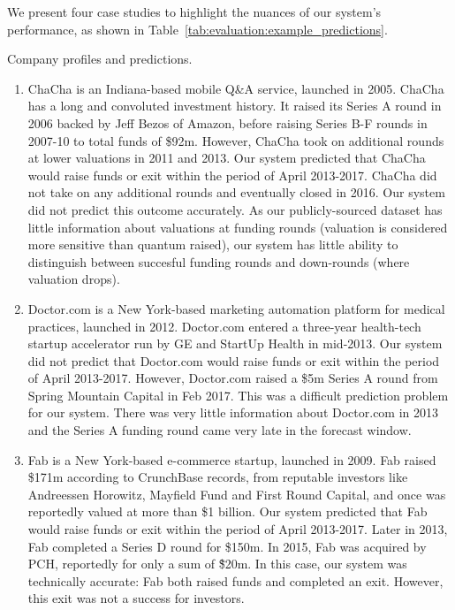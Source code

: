 ﻿\documentclass[../thesis/thesis.tex]{subfiles}
\begin{document}
We present four case studies to highlight the nuances of our system's performance, as shown in Table~\ref{tab:evaluation:example_predictions}. 

\begin{table}[!htb]
    \centering
    \scalebox{0.9}{}
    \caption[Company profiles and predictions]{Company profiles and predictions.}
    \label{tab:evaluation:example_predictions}
\end{table}

\begin{enumerate}

\item ChaCha is an Indiana-based mobile Q\&A service, launched in 2005. ChaCha has a long and convoluted investment history. It raised its Series A round in 2006 backed by Jeff Bezos of Amazon, before raising Series B-F rounds in 2007-10 to total funds of \$92m. However, ChaCha took on additional rounds at lower valuations in 2011 and 2013. Our system predicted that ChaCha would raise funds or exit within the period of April 2013-2017. ChaCha did not take on any additional rounds and eventually closed in 2016. Our system did not predict this outcome accurately. As our publicly-sourced dataset has little information about valuations at funding rounds (valuation is considered more sensitive than quantum raised), our system has little ability to distinguish between succesful funding rounds and down-rounds (where valuation drops). 

\item Doctor.com is a New York-based marketing automation platform for medical practices, launched in 2012. Doctor.com entered a three-year health-tech startup accelerator run by GE and StartUp Health in mid-2013. Our system did not predict that Doctor.com would raise funds or exit within the period of April 2013-2017. However, Doctor.com raised a \$5m Series A round from Spring Mountain Capital in Feb 2017. This was a difficult prediction problem for our system. There was very little information about Doctor.com in 2013 and the Series A funding round came very late in the forecast window. 

\item Fab is a New York-based e-commerce startup, launched in 2009. Fab raised \$171m according to CrunchBase records, from reputable investors like Andreessen Horowitz, Mayfield Fund and First Round Capital, and once was reportedly valued at more than \$1 billion. Our system predicted that Fab would raise funds or exit within the period of April 2013-2017. Later in 2013, Fab completed a Series D round for \$150m. In 2015, Fab was acquired by PCH, reportedly for only a sum of \~\$20m. In this case, our system was technically accurate: Fab both raised funds and completed an exit. However, this exit was not a success for investors.


\end{enumerate}
\end{document}

